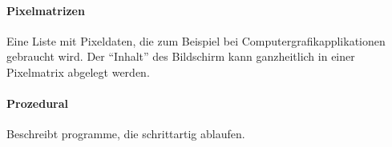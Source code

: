 \documentclass[12pt,a4paper,german]{report}
\begin{document}
\paragraph{Pixelmatrizen} Eine Liste mit Pixeldaten, die zum Beispiel bei Computergrafikapplikationen gebraucht wird. Der ``Inhalt'' des Bildschirm kann ganzheitlich in einer Pixelmatrix abgelegt werden.
\paragraph{Prozedural} Beschreibt programme, die schrittartig ablaufen.



\clearpage



\listoffigures
\end{document}
